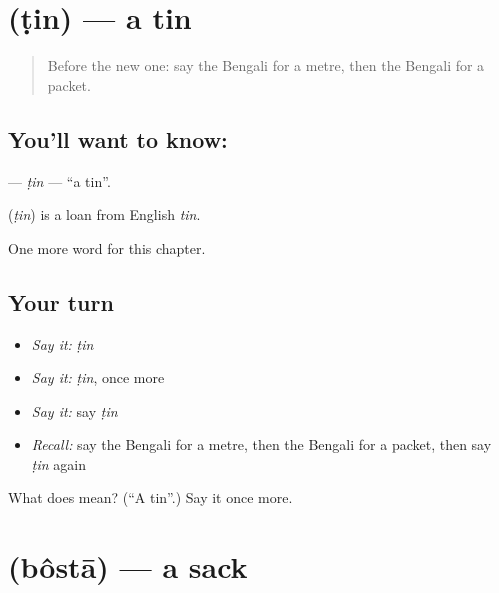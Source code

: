 \section[\texorpdfstring{\bn{টিন} (ṭin)}{টিন (ṭin)}]{ (ṭin) — a tin}

\label{lesson:BN-C233-tin}



\begin{quote}
Before the new one: say the Bengali for a metre, then the Bengali for a packet.
\end{quote}

\subsection*{You'll want to know: }
\textbf{} — \emph{ṭin} — \textquotedblleft{}a tin\textquotedblright{}.

\begin{cousinweb}
\textbf{} (\emph{ṭin}) is a loan from English \emph{tin}.
\end{cousinweb}

\begin{grammarlens}[title={What you've built}]
One more word for this chapter.
\end{grammarlens}

\subsection*{Your turn}
\begin{itemize}
\raggedright
  \item \emph{Say it:} \emph{ṭin}
  \item \emph{Say it:} \emph{ṭin}, once more
  \item \emph{Say it:} say \emph{ṭin}
  \item \emph{Recall:} say the Bengali for a metre, then the Bengali for a packet, then say \emph{ṭin} again
\end{itemize}

\begin{tcolorbox}[breakable,colback=teal!4,colframe=teal!35!black,title={Before you move on}]
What does  mean? (\textquotedblleft{}A tin\textquotedblright{}.) Say it once more.
\end{tcolorbox}
\section[\texorpdfstring{\bn{বস্তা} (bôstā)}{বস্তা (bôstā)}]{ (bôstā) — a sack}

